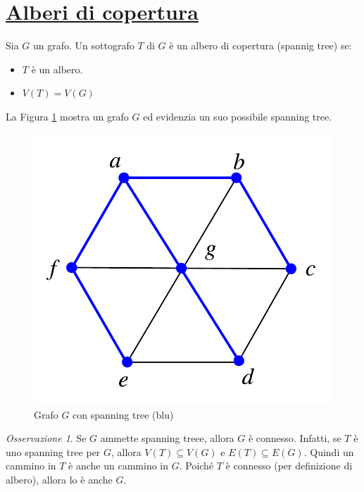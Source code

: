 \documentclass[oneside]{book}
\theoremstyle{remark}
\newtheorem*{osservaz}{Osservazione}
\begin{document}
\section{\underline{Alberi di copertura}}
\begin{tcolorbox}[colback=yellow!30, colframe=yellow!30!black, title=Albero di copertura]
Sia $G$ un grafo. Un sottografo $T$ di $G$ è un albero di copertura (spannig tree) se:
\begin{itemize}
\item $T$ è un albero.
\item $V(T)=V(G)$
\end{itemize}
\end{tcolorbox}

La Figura \ref{spanning} mostra un grafo $G$ ed evidenzia un suo possibile
spanning tree.

\begin{figure}[H]
\centering
\includegraphics[scale = 0.6]{figures/spanningtree.pdf}
\caption{Grafo $G$ con spanning tree (blu)}
\label{spanning}
\end{figure}

\begin{osservaz}
Se $G$ ammette spanning treee, allora $G$ è connesso. Infatti, se
$T$ è uno spanning tree per $G$, allora $V(T)\subseteq V(G)$ e
$E(T)\subseteq E(G)$. Quindi un cammino in $T$ è anche un cammino
in $G$. Poiché $T$ è connesso (per definizione di albero), allora
lo è anche $G$.
\end{osservaz}
\end{document}
